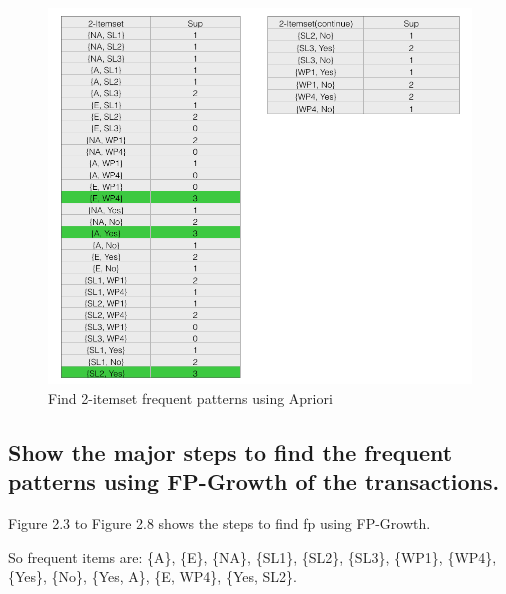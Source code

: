 \documentclass[paper=a4, fontsize=11pt]{scrartcl} %
\numberwithin{equation}{section} %
\numberwithin{figure}{section} %
\numberwithin{table}{section} %
\begin{document}
\begin{figure}[h]
    \centering
    \includegraphics[scale=0.4]{image2.png}
    \caption{Find 2-itemset frequent patterns using Apriori}
\end{figure}

\subsection{Show the major steps to find the frequent patterns using FP-Growth of the transactions.}

Figure 2.3 to Figure 2.8 shows the steps to find fp using FP-Growth.

So frequent items are:
\{A\}, \{E\}, \{NA\}, \{SL1\}, \{SL2\}, \{SL3\}, \{WP1\}, \{WP4\}, \{Yes\}, \{No\}, 
\{Yes, A\}, \{E, WP4\}, \{Yes, SL2\}.
\end{document}
